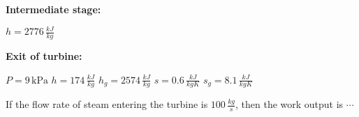     
    \textbf{Intermediate stage:} 
    
        $h = 2776 \, \frac{kJ}{kg}$
    
    
    \textbf{Exit of turbine:} 
    
         $P = 9 \, \text{kPa}$
         $h = 174 \, \frac{kJ}{kg}$
        $h_g = 2574 \, \frac{kJ}{kg}$
         $s = 0.6 \, \frac{kJ}{kgK}$
         $s_g = 8.1 \, \frac{kJ}{kgK}$
   
    
    If the flow rate of steam entering the turbine is $100 \, \frac{kg}{s}$, then the work output  is $\cdots$

 
 


